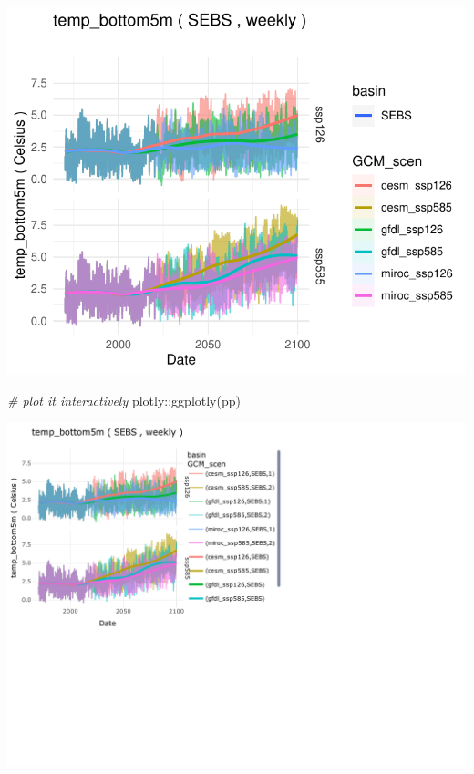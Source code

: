 \documentclass[
]{article}
\newenvironment{Shaded}{\begin{snugshade}}{\end{snugshade}}
\newcommand{\CommentTok}[1]{\textcolor[rgb]{0.56,0.35,0.01}{\textit{#1}}}
\newcommand{\FunctionTok}[1]{\textcolor[rgb]{0.00,0.00,0.00}{#1}}
\newcommand{\NormalTok}[1]{#1}
\newcommand{\SpecialCharTok}[1]{\textcolor[rgb]{0.00,0.00,0.00}{#1}}
\begin{document}
\begin{center}\includegraphics{ACLIM2_quickStart_files/figure-latex/sizespec-3} \end{center}

\begin{Shaded}
\begin{Highlighting}[]
  \CommentTok{\# plot it interactively}
\NormalTok{  plotly}\SpecialCharTok{::}\FunctionTok{ggplotly}\NormalTok{(pp)}
\end{Highlighting}
\end{Shaded}

\begin{center}\includegraphics{ACLIM2_quickStart_files/figure-latex/unnamed-chunk-7-1} \end{center}
\end{document}
